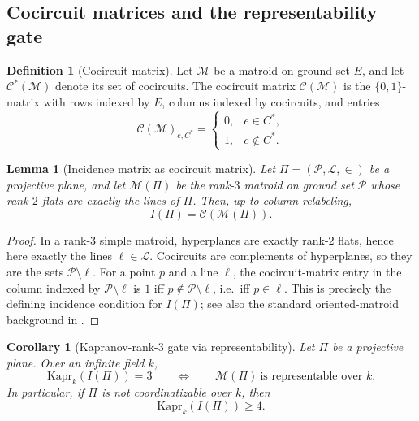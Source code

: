 \documentclass[11pt]{amsart}
\numberwithin{equation}{section}
\theoremstyle{plain}
\newtheorem{lemma}[theorem]{Lemma}
\newtheorem{corollary}[theorem]{Corollary}
\theoremstyle{definition}
\newtheorem{definition}[theorem]{Definition}
\theoremstyle{remark}
\newcommand{\Kapr}{\mathrm{Kapr}}
\begin{document}

\subsection{Cocircuit matrices and the representability gate}
\begin{definition}[Cocircuit matrix]
Let $\mathcal M$ be a matroid on ground set $E$, and let $\mathcal C^*(\mathcal M)$ denote its set of cocircuits.
The cocircuit matrix $\mathcal C(\mathcal M)$ is the $\{0,1\}$-matrix with rows indexed by $E$, columns indexed by cocircuits,
and entries
\[
\mathcal C(\mathcal M)_{e,C^*}=
\begin{cases}
0,& e\in C^*,\\
1,& e\notin C^*.
\end{cases}
\]
\end{definition}

\begin{lemma}[Incidence matrix as cocircuit matrix]
\label{lem:incidence-as-cocircuit}
Let $\Pi=(\mathcal P,\mathcal L,\in)$ be a projective plane, and let $\mathcal M(\Pi)$ be the rank-$3$ matroid on ground set
$\mathcal P$ whose rank-$2$ flats are exactly the lines of $\Pi$. Then, up to column relabeling,
\[
I(\Pi)=\mathcal C(\mathcal M(\Pi)).
\]
\end{lemma}

\begin{proof}
In a rank-$3$ simple matroid, hyperplanes are exactly rank-$2$ flats, hence here exactly the lines $\ell\in\mathcal L$.
Cocircuits are complements of hyperplanes, so they are the sets $\mathcal P\setminus \ell$. For a point $p$ and a line $\ell$,
the cocircuit-matrix entry in the column indexed by $\mathcal P\setminus \ell$ is $1$ iff
$p\notin \mathcal P\setminus \ell$, i.e.\ iff $p\in \ell$. This is precisely the defining incidence condition for $I(\Pi)$; see also the standard oriented-matroid background in \cite{bjornerLasVergnasSturmfelsWhiteZiegler1999}.
\end{proof}

\begin{corollary}[Kapranov-rank-$3$ gate via representability]
\label{cor:kapr3-representability-gate}
Let $\Pi$ be a projective plane. Over an infinite field $k$,
\[
\Kapr_k(I(\Pi))=3
\qquad\Longleftrightarrow\qquad
\mathcal M(\Pi)\ \text{is representable over }k.
\]
In particular, if $\Pi$ is not coordinatizable over $k$, then
\[
\Kapr_k(I(\Pi))\ge 4.
\]
\end{corollary}
\end{document}
